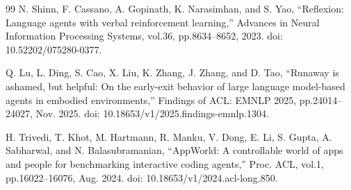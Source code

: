 \begin{thebibliography}{99}
N. Shinn, F. Cassano, A. Gopinath, K. Narasimhan, and S. Yao,
``Reflexion: Language agents with verbal reinforcement learning,''
Advances in Neural Information Processing Systems, vol.36, pp.8634--8652, 2023.
doi: 10.52202/075280-0377.

Q. Lu, L. Ding, S. Cao, X. Liu, K. Zhang, J. Zhang, and D. Tao,
``Runaway is ashamed, but helpful: On the early-exit behavior of large language model-based agents in embodied environments,''
Findings of ACL: EMNLP 2025, pp.24014--24027, Nov. 2025.
doi: 10.18653/v1/2025.findings-emnlp.1304.

H. Trivedi, T. Khot, M. Hartmann, R. Manku, V. Dong, E. Li, S. Gupta,
A. Sabharwal, and N. Balasubramanian,
``AppWorld: A controllable world of apps and people for benchmarking interactive coding agents,''
Proc. ACL, vol.1, pp.16022--16076, Aug. 2024.
doi: 10.18653/v1/2024.acl-long.850.

\end{thebibliography}
